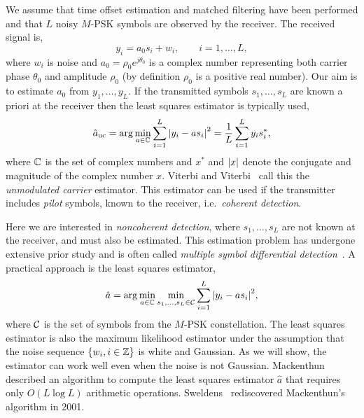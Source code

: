 \documentclass{article}
\begin{document}
We assume that time offset estimation and matched filtering have been performed and that $L$ noisy $M$-PSK symbols are observed by the receiver.  The received signal is,
\begin{equation}\label{eq:sigmod}
y_i = a_0 s_i + w_i, \qquad i = 1, \dots, L,
\end{equation}
where $w_i$ is noise and $a_0 = \rho_0 e^{j\theta_0}$ is a complex number representing both carrier phase $\theta_0$ and amplitude $\rho_0$ (by definition $\rho_0$ is a positive real number).  Our aim is to estimate $a_0$ from $y_1, \dots, y_L$.  If the transmitted symbols $s_1, \dots, s_L$ are known a priori at the receiver then the least squares estimator is typically used,
\begin{equation}\label{eq:hataumod}
\hat{a}_{\text{uc}} = \arg \min_{a \in {\mathbb C}} \sum_{i = 1}^L {\left\vert  y_i - a s_i  \right\vert}^2  = \frac{1}{L} \sum_{i = 1}^L y_i s_i^*,
\end{equation}
where ${\mathbb C}$ is the set of complex numbers and $x^*$ and ${\left\vert x \right\vert}$ denote the conjugate and magnitude of the complex number $x$.  Viterbi and Viterbi~\cite{ViterbiViterbi_phase_est_1983} call this the \emph{unmodulated carrier} estimator.  This estimator can be used if the transmitter includes \emph{pilot} symbols, known to the receiver, i.e.~\emph{coherent detection}.

Here we are interested in \emph{noncoherent detection}, where $s_1, \dots, s_L$ are not known at the receiver, and must also be estimated.  This estimation problem has undergone extensive prior study and is often called \emph{multiple symbol differential detection}~\cite{ViterbiViterbi_phase_est_1983,Cowley_ref_sym_carr_1998,Wilson1989,Makrakis1990,Liu1991,Mackenthun1994,Sweldens2001,McKilliamLinearTimeBlockPSK2009,Divsalar1990}.  A practical approach is the least squares estimator,
\begin{equation}\label{eq:hatadef}
\hat{a} = \arg\min_{a \in {\mathbb C}} \min_{s_1, \dots, s_L \in \mathcal C} \sum_{i = 1}^L {\left\vert  y_i - a s_i  \right\vert}^2,
\end{equation}
where $\mathcal C$ is the set of symbols from the $M$-PSK constellation.  The least squares estimator is also the maximum likelihood estimator under the assumption that the noise sequence $\{w_i, i \in {\mathbb Z}\}$ is white and Gaussian.  As we will show, the estimator can work well even when the noise is not Gaussian.  Mackenthun~\cite{Mackenthun1994} described an algorithm to compute the least squares estimator $\hat{a}$ that requires only $O(L \log L)$ arithmetic operations.  Sweldens~\cite{Sweldens2001} rediscovered Mackenthun's algorithm in 2001.
\end{document}
